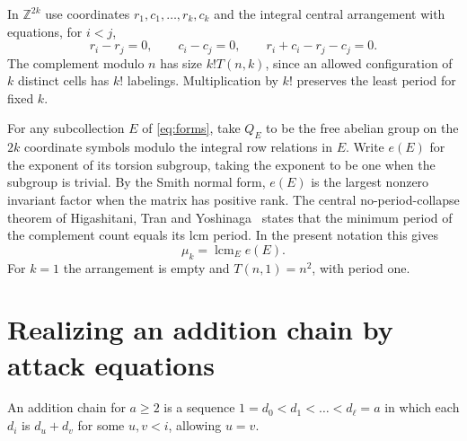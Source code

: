 \documentclass[10pt]{article}
\newcommand{\Z}{\mathbb Z}
\newcommand{\lcm}{\operatorname{lcm}}
\begin{document}
In $\Z^{2k}$ use coordinates $r_1,c_1,\ldots,r_k,c_k$ and the integral central arrangement with equations, for $i<j$,
\begin{equation}\label{eq:forms}
 r_i-r_j=0,\qquad c_i-c_j=0,\qquad r_i+c_i-r_j-c_j=0.
\end{equation}
The complement modulo $n$ has size $k!T(n,k)$, since an allowed configuration of $k$ distinct cells has $k!$ labelings. Multiplication by $k!$ preserves the least period for fixed $k$.

For any subcollection $E$ of \eqref{eq:forms}, take $Q_E$ to be the free abelian group on the $2k$ coordinate symbols modulo the integral row relations in $E$. Write $e(E)$ for the exponent of its torsion subgroup, taking the exponent to be one when the subgroup is trivial. By the Smith normal form, $e(E)$ is the largest nonzero invariant factor when the matrix has positive rank. The central no-period-collapse theorem of Higashitani, Tran and Yoshinaga~\cite[Thm.~1.2]{hty} states that the minimum period of the complement count equals its lcm period. In the present notation this gives
\begin{equation}\label{eq:lcm}
 \mu_k=\lcm_{E}e(E).
\end{equation}
For $k=1$ the arrangement is empty and $T(n,1)=n^2$, with period one.

\section{Realizing an addition chain by attack equations}
An addition chain for $a\ge2$ is a sequence $1=d_0<d_1<\dots<d_\ell=a$ in which each $d_i$ is $d_u+d_v$ for some $u,v<i$, allowing $u=v$.
\end{document}
